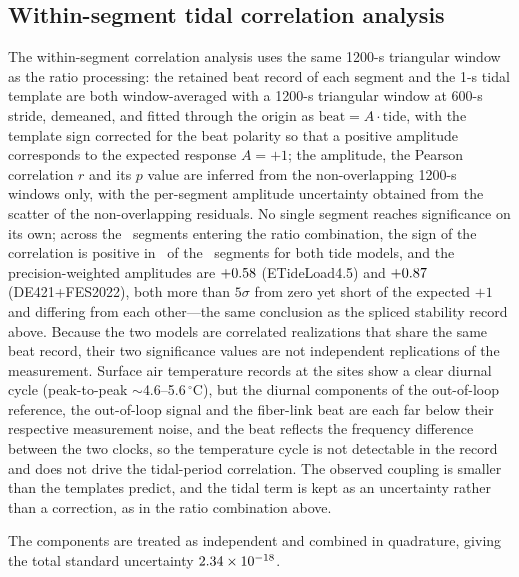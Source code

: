 \subsection*{Within-segment tidal correlation analysis}

The within-segment correlation analysis uses the
same 1200-s triangular window as the ratio processing: the retained
beat record of each segment and the 1-s tidal template are both
window-averaged with a 1200-s triangular window at 600-s stride,
demeaned, and fitted through the origin as
$\mathrm{beat} = A\cdot\mathrm{tide}$, with the template sign
corrected for the beat polarity so that a positive amplitude
corresponds to the expected response $A = +1$; the amplitude, the
Pearson correlation $r$ and its $p$ value are inferred from the
non-overlapping 1200-s windows only, with the per-segment amplitude
uncertainty obtained from the scatter of the non-overlapping
residuals. No single segment reaches significance on its own; across
the \nSeg~segments entering the ratio combination, the sign of the
correlation is positive in \tidalNegSeg~of the \nSeg~segments for
both tide models, and the precision-weighted amplitudes are
$+0.58$ (ETideLoad4.5) and $+0.87$
(DE421+FES2022), both more than $5\sigma$ from zero yet short of the
expected $+1$ and differing from each other---the same conclusion as
the spliced stability record above. Because the two models are
correlated realizations that share the same beat record, their two
significance values are not independent replications of the
measurement. Surface air temperature records at the sites show
a clear diurnal cycle (peak-to-peak $\sim$4.6--5.6\,$^\circ$C), but
the diurnal components of the out-of-loop reference, the out-of-loop
signal and the fiber-link beat are each far below their respective
measurement noise, and the beat reflects the frequency difference
between the two clocks, so the temperature cycle is not detectable in
the record and does not drive the tidal-period correlation. The
observed coupling is smaller than the templates predict, and the
tidal term is kept as an uncertainty rather than a correction, as in
the ratio combination above.

The components are treated as independent
and combined in quadrature, giving the total standard uncertainty
$2.34 \times 10^{-18}$.
